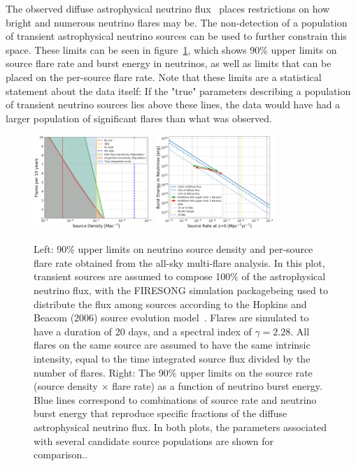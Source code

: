 The observed diffuse astrophysical neutrino flux~\cite{stettner2019measurement} places restrictions on how bright and numerous neutrino flares may be. The non-detection of a population of transient astrophysical neutrino sources can be used to further constrain this space. These limits can be seen in figure~\ref{fig:mfskylims}, which shows 90\% upper limits on source flare rate and burst energy in neutrinos, as well as limits that can be placed on the per-source flare rate. Note that these limits are a statistical statement about the data itself: If the "true" parameters describing a population of transient neutrino sources lies above these lines, the data would have had a larger population of significant flares than what was observed. 

\begin{figure}[h]
\centering
\includegraphics[width=0.4\textwidth]{figs/flarelims.png}
\includegraphics[width=0.4\textwidth]{figs/sourceratelims.png}
\caption{Left: 90\% upper limits on neutrino source density and per-source flare rate obtained from the all-sky multi-flare analysis. In this plot, transient sources are assumed to compose 100\% of the astrophysical neutrino flux, with the FIRESONG simulation package\footnotemark  being used to distribute the flux among sources according to the Hopkins and Beacom (2006) source evolution model~\cite{Hopkins_2006}. Flares are simulated to have a duration of 20 days, and a spectral index of $\gamma=2.28$. All flares on the same source are assumed to have the same intrinsic intensity, equal to the time integrated source flux divided by the number of flares. Right: The 90\% upper limits on the source rate (source density $\times$ flare rate) as a function of neutrino burst energy. Blue lines correspond to combinations of source rate and neutrino burst energy that reproduce specific fractions of the diffuse astrophysical neutrino flux. In both plots, the parameters associated with several candidate source populations are shown for comparison..}
\label{fig:mfskylims}
\end{figure}

